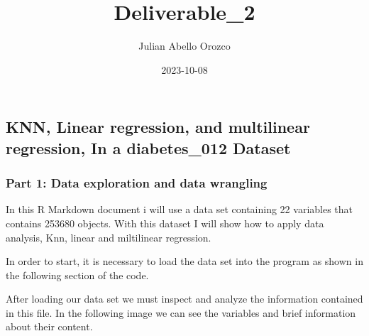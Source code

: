 \documentclass[
]{article}
\title{Deliverable\_2}
\author{Julian Abello Orozco}
\date{2023-10-08}
\newenvironment{Shaded}{\begin{snugshade}}{\end{snugshade}}
\newcommand{\FunctionTok}[1]{\textcolor[rgb]{0.13,0.29,0.53}{\textbf{#1}}}
\newcommand{\NormalTok}[1]{#1}
\newcommand{\OtherTok}[1]{\textcolor[rgb]{0.56,0.35,0.01}{#1}}
\newcommand{\SpecialCharTok}[1]{\textcolor[rgb]{0.81,0.36,0.00}{\textbf{#1}}}
\newcommand{\StringTok}[1]{\textcolor[rgb]{0.31,0.60,0.02}{#1}}
\begin{document}
\maketitle

\hypertarget{knn-linear-regression-and-multilinear-regression-in-a-diabetes_012-dataset}{%
\subsection{KNN, Linear regression, and multilinear regression, In a
diabetes\_012
Dataset}\label{knn-linear-regression-and-multilinear-regression-in-a-diabetes_012-dataset}}

\hypertarget{part-1-data-exploration-and-data-wrangling}{%
\subsubsection{Part 1: Data exploration and data
wrangling}\label{part-1-data-exploration-and-data-wrangling}}

In this R Markdown document i will use a data set containing 22
variables that contains 253680 objects. With this dataset I will show
how to apply data analysis, Knn, linear and miltilinear regression.

In order to start, it is necessary to load the data set into the program
as shown in the following section of the code.

\begin{Shaded}
\end{Shaded}

After loading our data set we must inspect and analyze the information
contained in this file. In the following image we can see the variables
and brief information about their content.
\end{document}

